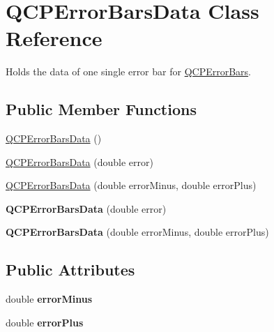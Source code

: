 \hypertarget{class_q_c_p_error_bars_data}{}\section{Q\+C\+P\+Error\+Bars\+Data Class Reference}
\label{class_q_c_p_error_bars_data}


Holds the data of one single error bar for \hyperlink{class_q_c_p_error_bars}{Q\+C\+P\+Error\+Bars}.  


\subsection*{Public Member Functions}
\begin{DoxyCompactItemize}
\item 
\hyperlink{class_q_c_p_error_bars_data_ac18bdb46dec56f8df7f3c99d058cc725}{Q\+C\+P\+Error\+Bars\+Data} ()
\item 
\hyperlink{class_q_c_p_error_bars_data_a73ebdaa55fa7f0052b70895b28edb444}{Q\+C\+P\+Error\+Bars\+Data} (double error)
\item 
\hyperlink{class_q_c_p_error_bars_data_a7c61e42d87aea3312262d5429bc28387}{Q\+C\+P\+Error\+Bars\+Data} (double error\+Minus, double error\+Plus)
\item 
\mbox{\label{class_q_c_p_error_bars_data_a73ebdaa55fa7f0052b70895b28edb444}} 
{\bfseries Q\+C\+P\+Error\+Bars\+Data} (double error)
\item 
\mbox{\label{class_q_c_p_error_bars_data_a7c61e42d87aea3312262d5429bc28387}} 
{\bfseries Q\+C\+P\+Error\+Bars\+Data} (double error\+Minus, double error\+Plus)
\end{DoxyCompactItemize}
\subsection*{Public Attributes}
\begin{DoxyCompactItemize}
\item 
\mbox{\label{class_q_c_p_error_bars_data_af8aaea160e52c14c57836224ee78020b}} 
double {\bfseries error\+Minus}
\item 
\mbox{\label{class_q_c_p_error_bars_data_ad1283c99fbfccf37a0226b1df52f0776}} 
double {\bfseries error\+Plus}
\end{DoxyCompactItemize}


